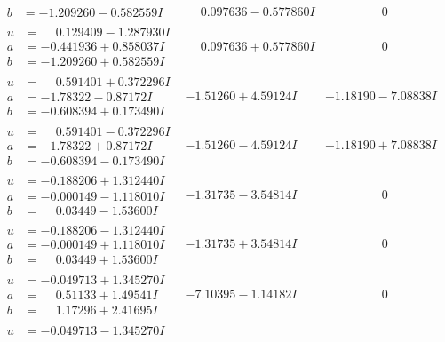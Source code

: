 \documentclass[1p]{elsarticle_modified}
\theoremstyle{definition}
\begin{document}
$$\begin{array}{c|c|c}
\begin{aligned}
b &= -1.209260 - 0.582559 I\end{aligned}
 & \phantom{-}0.097636 - 0.577860 I & \phantom{-0.000000 } 0 \\ \hline\begin{aligned}
u &= \phantom{-}0.129409 - 1.287930 I \\
a &= -0.441936 + 0.858037 I \\
b &= -1.209260 + 0.582559 I\end{aligned}
 & \phantom{-}0.097636 + 0.577860 I & \phantom{-0.000000 } 0 \\ \hline\begin{aligned}
u &= \phantom{-}0.591401 + 0.372296 I \\
a &= -1.78322 - 0.87172 I \\
b &= -0.608394 + 0.173490 I\end{aligned}
 & -1.51260 + 4.59124 I & -1.18190 - 7.08838 I \\ \hline\begin{aligned}
u &= \phantom{-}0.591401 - 0.372296 I \\
a &= -1.78322 + 0.87172 I \\
b &= -0.608394 - 0.173490 I\end{aligned}
 & -1.51260 - 4.59124 I & -1.18190 + 7.08838 I \\ \hline\begin{aligned}
u &= -0.188206 + 1.312440 I \\
a &= -0.000149 - 1.118010 I \\
b &= \phantom{-}0.03449 - 1.53600 I\end{aligned}
 & -1.31735 - 3.54814 I & \phantom{-0.000000 } 0 \\ \hline\begin{aligned}
u &= -0.188206 - 1.312440 I \\
a &= -0.000149 + 1.118010 I \\
b &= \phantom{-}0.03449 + 1.53600 I\end{aligned}
 & -1.31735 + 3.54814 I & \phantom{-0.000000 } 0 \\ \hline\begin{aligned}
u &= -0.049713 + 1.345270 I \\
a &= \phantom{-}0.51133 + 1.49541 I \\
b &= \phantom{-}1.17296 + 2.41695 I\end{aligned}
 & -7.10395 - 1.14182 I & \phantom{-0.000000 } 0 \\ \hline\begin{aligned}
u &= -0.049713 - 1.345270 I \\

\end{aligned}
\end{array}$$
\end{document}
